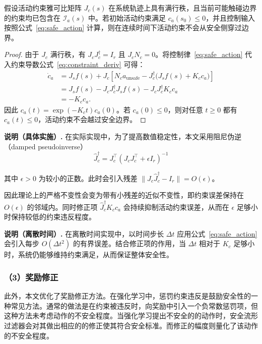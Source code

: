 \begin{theorem}[活动约束不变性]
\label{thm:safety}
假设活动约束雅可比矩阵 $J_c(s)$ 在系统轨迹上具有满行秩，且当前可能触碰边界的约束均已包含在 $\mathcal{I}_a(s)$ 中。若初始活动约束满足 $c_a(s_0)\leq 0$，并且控制输入按照公式~\eqref{eq:safe_action} 计算，则在连续时间下活动约束不会从安全侧穿过边界。
\end{theorem}

\begin{proof}
\renewcommand{\qedsymbol}{}%
由于 $J_c$ 满行秩，有 $J_cJ_c^\dagger=I_r$ 且 $J_cN_c=0$。将控制律~\eqref{eq:safe_action} 代入约束导数公式~\eqref{eq:constraint_deriv} 可得：
\begin{align*}
    \dot{c}_a
    &= J_s f(s)+J_c\!\left[N_c a_{\text{unsafe}}-J_c^\dagger\bigl(J_s f(s)+K_c c_a\bigr)\right] \\
    &= J_s f(s)-J_cJ_c^\dagger J_s f(s)-J_cJ_c^\dagger K_c c_a \\
    &= -K_c c_a .
\end{align*}
因此 $c_a(t)=\exp(-K_ct)c_a(0)$。若 $c_a(0)\leq 0$，则对任意 $t\geq0$ 都有 $c_a(t)\leq0$，活动约束不会越过安全边界。
\end{proof}

\textbf{说明（具体实施）.} 在实际实现中，为了提高数值稳定性，本文采用阻尼伪逆（damped pseudoinverse）
\[
    \hat{J}_c^\dagger = J_c^\top (J_c J_c^\top + \epsilon I_r)^{-1}
\]

其中 $\epsilon > 0$ 为较小的正数。此时会引入残差 $\|J_c\hat{J}_c^\dagger-I_r\|=O(\epsilon)$。

因此理论上的严格不变性会变为带有小残差的近似不变性，即约束误差保持在 $O(\epsilon)$ 的邻域内。同时修正项 $\hat{J}_c^\dagger K_c c_a$ 会持续抑制活动约束误差，从而在 $\epsilon$ 足够小时保持较低的约束违反程度。

\textbf{说明（离散时间）.} 在离散时间实现中，以时间步长 $\Delta t$ 应用公式~\eqref{eq:safe_action} 会引入每步
$O(\Delta t^2)$
的有界误差。结合修正项的作用，当 $\Delta t$ 相对于 $K_c$ 足够小时，系统仍能够维持约束满足，从而保证整体安全性。

\subsubsection{（3）奖励修正}
此外，本文优化了奖励修正方法。在强化学习中，惩罚约束违反是鼓励安全性的一种常见方法。通常的做法是在约束被违反时，向奖励中引入一个负常数惩罚项，但这种方法未考虑动作的不安全程度。当强化学习提出不安全的的动作时，安全流形过滤器会对其做出相应的的修正使其符合安全标准。而修正的幅度则量化了该动作的不安全程度。

